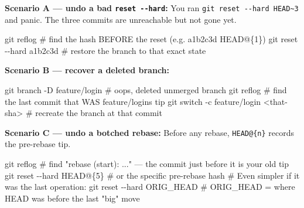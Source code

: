 \documentclass[11pt]{article}
\newenvironment{Shaded}{\begin{snugshade}}{\end{snugshade}}
\newcommand{\AttributeTok}[1]{\textcolor[rgb]{0.16,0.50,0.73}{#1}}
\newcommand{\CommentTok}[1]{\textcolor[rgb]{0.48,0.49,0.49}{#1}}
\newcommand{\FunctionTok}[1]{\textcolor[rgb]{0.56,0.27,0.68}{#1}}
\newcommand{\NormalTok}[1]{\textcolor[rgb]{0.81,0.81,0.76}{#1}}
\newcommand{\OperatorTok}[1]{\textcolor[rgb]{0.81,0.81,0.76}{#1}}
\begin{document}
\textbf{Scenario A --- undo a bad \texttt{reset\ -\/-hard}:} You ran \texttt{git\ reset\ -\/-hard\ HEAD\textasciitilde{}3} and panic. The three commits are unreachable but not gone yet.


\begin{Shaded}
\begin{Highlighting}[]
\FunctionTok{git}\NormalTok{ reflog                       }\CommentTok{\# find the hash BEFORE the reset (e.g. a1b2c3d HEAD@\{1\})}
\FunctionTok{git}\NormalTok{ reset }\AttributeTok{{-}{-}hard}\NormalTok{ a1b2c3d         }\CommentTok{\# restore the branch to that exact state}
\end{Highlighting}
\end{Shaded}

\textbf{Scenario B --- recover a deleted branch:}


\begin{Shaded}
\begin{Highlighting}[]
\FunctionTok{git}\NormalTok{ branch }\AttributeTok{{-}D}\NormalTok{ feature/login      }\CommentTok{\# oops, deleted unmerged branch}
\FunctionTok{git}\NormalTok{ reflog                       }\CommentTok{\# find the last commit that WAS feature/login\textquotesingle{}s tip}
\FunctionTok{git}\NormalTok{ switch }\AttributeTok{{-}c}\NormalTok{ feature/login }\OperatorTok{\textless{}}\NormalTok{that{-}sha}\OperatorTok{\textgreater{}}   \CommentTok{\# recreate the branch at that commit}
\end{Highlighting}
\end{Shaded}

\textbf{Scenario C --- undo a botched rebase:} Before any rebase, \texttt{HEAD@\{n\}} records the pre-rebase tip.


\begin{Shaded}
\begin{Highlighting}[]
\FunctionTok{git}\NormalTok{ reflog                       }\CommentTok{\# find "rebase (start): ..." — the commit just before it is your old tip}
\FunctionTok{git}\NormalTok{ reset }\AttributeTok{{-}{-}hard}\NormalTok{ HEAD@\{5\}        }\CommentTok{\# or the specific pre{-}rebase hash}
\CommentTok{\# Even simpler if it was the last operation:}
\FunctionTok{git}\NormalTok{ reset }\AttributeTok{{-}{-}hard}\NormalTok{ ORIG\_HEAD       }\CommentTok{\# ORIG\_HEAD = where HEAD was before the last "big" move}
\end{Highlighting}
\end{Shaded}
\end{document}
